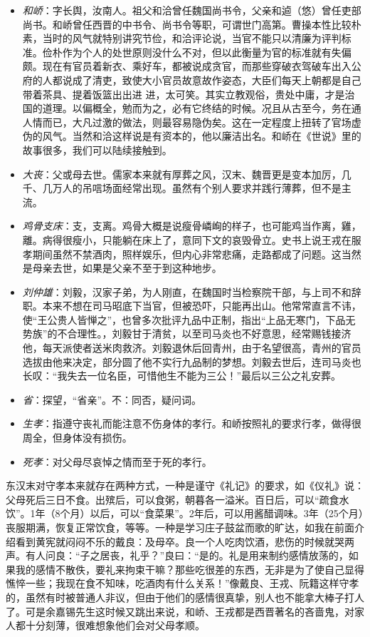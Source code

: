 \documentclass[]{book}
\providecommand{\tightlist}{%
  \setlength{\itemsep}{0pt}\setlength{\parskip}{0pt}}
\begin{document}
\begin{itemize}
\tightlist
\item
  \emph{和峤}：字长舆，汝南人。祖父和洽曾任魏国尚书令，父亲和逌（悠）曾任吏部尚书。和峤曾任西晋的中书令、尚书令等职，可谓世门高第。曹操本性比较朴素，当时的风气就特别讲究节俭，和洽评论说，当官不能只以清廉为评判标准。俭朴作为个人的处世原则没什么不对，但以此衡量为官的标准就有失偏颇。现在有官员着新衣、乘好车，都被说成贪官，而那些穿破衣驾破车出入公府的人都说成了清吏，致使大小官员故意故作姿态，大臣们每天上朝都是自己带着茶具、提着饭篮出出进
  进，太可笑。其实立教观俗，贵处中庸，才是治国的道理。以偏概全，勉而为之，必有它终结的时候。况且从古至今，务在通人情而已，大凡过激的做法，则最容易隐伪矣。这在一定程度上扭转了官场虚伪的风气。当然和洽这样说是有资本的，他以廉洁出名。和峤在《世说》里的故事很多，我们可以陆续接触到。
\item
  \emph{大丧}：父或母去世。儒家本来就有厚葬之风，汉末、魏晋更是变本加厉，几千、几万人的吊唁场面经常出现。虽然有个别人要求并践行薄葬，但不是主流。
\item
  \emph{鸡骨支床}：支，支离。鸡骨大概是说瘦骨嶙峋的样子，也可能鸡当作离，雞，離。病得很瘦小，只能躺在床上了，意同下文的哀毁骨立。史书上说王戎在服孝期间虽然不禁酒肉，照样娱乐，但内心非常悲痛，走路都成了问题。这当然是母亲去世，如果是父亲不至于到这种地步。
\item
  \emph{刘仲雄}：刘毅，汉家子弟，为人刚直，在魏国时当检察院干部，与上司不和辞职。本来不想在司马昭底下当官，但被恐吓，只能再出山。他常常直言不讳，使``王公贵人皆惮之''，也曾多次批评九品中正制，指出``上品无寒门，下品无势族''的不合理性。，刘毅甘于清贫，以至司马炎也不好意思，经常赐钱接济他，每天派使者送米肉救济。刘毅退休后回青州，由于名望很高，青州的官员选拔由他来决定，部分圆了他不实行九品制的梦想。刘毅去世后，连司马炎也长叹：``我失去一位名臣，可惜他生不能为三公！''最后以三公之礼安葬。
\item
  \emph{省}：探望，``省亲''。不：同否，疑问词。
\item
  \emph{生孝}：指遵守丧礼而能注意不伤身体的孝行。和峤按照礼的要求行孝，做得很周全，但身体没有损伤。
\item
  \emph{死孝}：对父母尽哀悼之情而至于死的孝行。
\end{itemize}

东汉末对守孝本来就存在两种方式，一种是谨守《礼记》的要求，如《仪礼》说：父母死后三日不食。出殡后，可以食粥，朝暮各一溢米。百日后，可以``疏食水饮''。1年（8个月）以后，可以``食菜果''。2年后，可以用酱醋调味。3年（25个月）丧服期满，恢复正常饮食，等等。一种是学习庄子鼓盆而歌的旷达，如我在前面介绍看到黄宪就闷闷不乐的戴良：及母卒。良一个人吃肉饮酒，悲伤的时候就哭两声。有人问良：``子之居丧，礼乎？''良曰：``是的。礼是用来制约感情放荡的，如果我的感情不散佚，要礼来拘束干嘛？那些吃很差的东西，无非是为了使自己显得憔悴一些；我现在食不知味，吃酒肉有什么关系！''像戴良、王戎、阮籍这样守孝的，虽然有时被普通人非议，但由于他们的感情很真挚，别人也不能拿大棒子打人了。可是余嘉锡先生这时候又跳出来说，和峤、王戎都是西晋著名的吝啬鬼，对家人都十分刻薄，很难想象他们会对父母孝顺。
\end{document}
